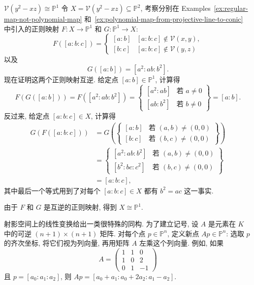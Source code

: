 \begin{Example}{$\mathcal{V}(y^{2}-xz)\cong\mathbb{P}^{1}$}\leavevmode\label{ex:projective-line-isomorphic-to-conic}
令 $X=\mathcal{V}(y^{2}-xz)\subseteq\mathbb{P}^{2}$, 考察分别在 Examples~\ref{ex:regular-map-not-polynomial-map} 和~\ref{ex:polynomial-map-from-projective-line-to-conic} 中引入的正则映射 $F:X\to\mathbb{P}^{1}$ 和 $G:\mathbb{P}^{1}\to X$:
\[
  F([a:b:c])=
  \begin{cases}
    [a:b] & [a:b:c]\notin\mathcal{V}(x,y),\\
    [b:c] & [a:b:c]\notin\mathcal{V}(y,z)
  \end{cases}
\]
以及
\[
  G([a:b])=[a^{2}:ab:b^{2}].
\]
现在证明这两个正则映射互逆. 给定点 $[a:b]\in\mathbb{P}^{1}$, 计算得
\[
  F(G([a:b]))=F([a^{2}:ab:b^{2}])
  =\left\{\begin{array}{ll}
    [a^{2}:ab] & \text{若 }a\ne0\\
    {[ab:b^{2}]} & \text{若 }b\ne0
  \end{array}\right\}=[a:b].
\]
反过来, 给定点 $[a:b:c]\in X$, 计算得
\[
  \begin{aligned}
  G(F([a:b:c]))
    &=G\left(\left\{\begin{array}{ll}
        [a:b] & \text{若 }(a,b)\ne(0,0)\\
        {[b:c]} & \text{若 }(b,c)\ne(0,0)
      \end{array}\right\}\right)\\
    &=\left\{\begin{array}{ll}
        [a^{2}:ab:b^{2}] & \text{若 }(a,b)\ne(0,0)\\
        {[b^{2}:bc:c^{2}]} & \text{若 }(b,c)\ne(0,0)
      \end{array}\right\}\\
    &=[a:b:c],
  \end{aligned}
\]
其中最后一个等式用到了对每个 $[a:b:c]\in X$ 都有 $b^{2}=ac$ 这一事实.

由于 $F$ 和 $G$ 是互逆的正则映射, 得到 $X\cong\mathbb{P}^{1}$.
\end{Example}

射影空间上的线性变换给出一类很特殊的同构. 为了建立记号, 设 $A$ 是元素在 $K$ 中的可逆 $(n+1)\times(n+1)$ 矩阵. 对每个点 $p\in\mathbb{P}^{n}$, 定义新点 $Ap\in\mathbb{P}^{n}$: 选取 $p$ 的齐次坐标, 将它们视为列向量, 再用矩阵 $A$ 左乘这个列向量. 例如, 如果
\[
  A=\begin{pmatrix}
     1&1&0\\
     1&0&2\\
     0&1&-1
  \end{pmatrix}
\]
且 $p=[a_{0}:a_{1}:a_{2}]$, 则 $Ap=[a_{0}+a_{1}:a_{0}+2a_{2}:a_{1}-a_{2}]$.

